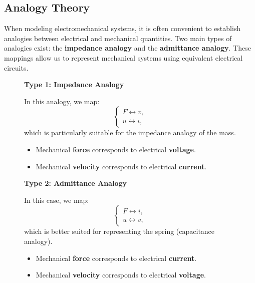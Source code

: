 \clearpage 

\subsection{Analogy Theory}

When modeling electromechanical systems, it is often convenient to establish analogies between electrical and mechanical quantities. Two main types of analogies exist: the \textbf{impedance analogy} and the \textbf{admittance analogy}. These mappings allow us to represent mechanical systems using equivalent electrical circuits.


\begin{figure}[H]
    \centering
    \begin{minipage}[c]{0.45\linewidth}
        \textbf{Type 1: Impedance Analogy}

In this analogy, we map:
\[
\begin{cases}
{F} \leftrightarrow v, \\
{u} \leftrightarrow i,
\end{cases}
\]
which is particularly suitable for the impedance analogy of the mass.

\begin{itemize}
    \item Mechanical \textbf{force} corresponds to electrical \textbf{voltage}.
    \item Mechanical \textbf{velocity} corresponds to electrical \textbf{current}.
\end{itemize}
    \end{minipage}\hfill
    \begin{minipage}[c]{0.45\linewidth}
        \textbf{Type 2: Admittance Analogy}
        
        In this case, we map:
\[
\begin{cases}
{F} \leftrightarrow i, \\
{u} \leftrightarrow v,
\end{cases}
\]
which is better suited for representing the spring (capacitance analogy).
\begin{itemize}
    \item Mechanical \textbf{force} corresponds to electrical \textbf{current}.
    \item Mechanical \textbf{velocity} corresponds to electrical \textbf{voltage}.
\end{itemize}
    \end{minipage}
\end{figure}


